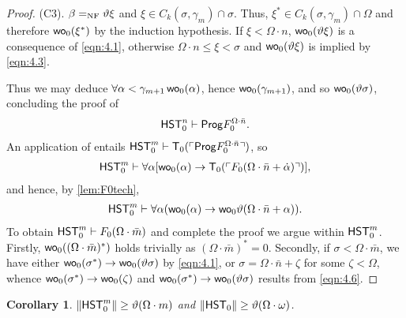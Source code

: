 \documentclass[UKenglish,cleveref,DIV=12]{scrartcl}
\newtheorem{corollary}[lemma]{Corollary}
\theoremstyle{definition}
\theoremstyle{definition}
\begin{document}
\begin{proof}
(C3). $\beta=_{\mathrm{NF}}\vartheta\xi$ and $\xi\in C_k(\sigma,\gamma_m)\cap\sigma$. Thus,
$\xi^*\in C_k(\sigma,\gamma_m)\cap\Omega$ and therefore $\mathsf{wo}_0(\xi^*)$ by the
induction hypothesis. If $\xi<\Omega\cdot n$, $\mathsf{wo}_0(\vartheta\xi)$ is a
consequence of \eqref{eqn:4.1}, otherwise $\Omega\cdot n\le\xi<\sigma$ and
$\mathsf{wo}_0(\vartheta\xi)$ is implied by \eqref{eqn:4.3}.

Thus we may deduce $\forall\alpha<\gamma_{m+1}\,\mathsf{wo}_0(\alpha)$, hence
$\mathsf{wo}_0(\gamma_{m+1})$, and so $\mathsf{wo}_0(\vartheta\sigma)$, concluding the proof of
\begin{align}\label{eqn:4.2}
  \mathsf{HST}_0^n\vdash\mathsf{Prog} F^{\Omega\cdot\bar n}_0.
\end{align}
An application of  entails $\mathsf{HST}_0^m\vdash \mathsf{T}_0(\ulcorner{\mathsf{Prog}F^{\Omega\cdot\bar n}_0}\urcorner)$, so
\begin{align*}
  \mathsf{HST}_0^m\vdash\forall\alpha[\mathsf{wo}_0(\alpha)\rightarrow
   \mathsf{T}_0(\ulcorner{F_0(\Omega\cdot\bar n+\dot\alpha)}\urcorner)],
\end{align*}
and hence, by \cref{lem:F0tech},
\begin{align}\label{eqn:4.6}
  \mathsf{HST}_0^m\vdash\forall\alpha(\mathsf{wo}_0(\alpha)\rightarrow\mathsf{wo}_0\vartheta(\Omega\cdot\bar
  n+\alpha)).
\end{align}
To obtain $\mathsf{HST}_0^m\vdash F_0(\Omega\cdot\bar m)$ and complete the proof we
argue within $\mathsf{HST}_0^m$. Firstly, $\mathsf{wo}_0((\Omega\cdot\bar m)^*)$ holds trivially as $(\Omega\cdot\bar m)^*=0$. Secondly, if
$\sigma<\Omega\cdot\bar m$, we have either $\mathsf{wo}_0(\sigma^*)\rightarrow
\mathsf{wo}_0(\vartheta\sigma)$ by \eqref{eqn:4.1}, or $\sigma=\Omega\cdot\bar
n+\zeta$ for some $\zeta<\Omega$, whence $\mathsf{wo}_0(\sigma^*)\rightarrow \mathsf{wo}_0(\zeta)$
and $\mathsf{wo}_0(\sigma^*)\rightarrow \mathsf{wo}_0(\vartheta\sigma)$ results from
\eqref{eqn:4.6}.
\end{proof}
\begin{corollary}\label{cor:F0lowerbound}
 $\lVert{\mathsf{HST}_0^m}\rVert\ge\vartheta(\Omega\cdot m)$ and $\lVert{\mathsf{HST}_0}\rVert\ge\vartheta(\Omega\cdot\omega)$.
\end{corollary}
\end{document}
